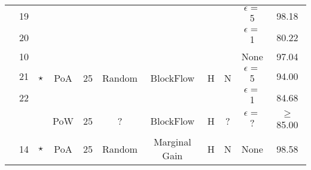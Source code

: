 \begin{landscape}
\begin{table}[]
\begin{tabular}{c|c|c|c|c|c|c|c|c|c|c}
                                                                                            & 19                  &                                            &                            &                          &                         &                                &                    &                    & $\epsilon =$ 5                  & 98.18                                  \\
                                                                                            & 20                  &                                            &                            &                          &                         &                                &                    &                    & $\epsilon =$ 1                  & 80.22                                  \\
                                                                                            & 10                  & \multirow{3}{*}{$\star$}                         & \multirow{3}{*}{PoA}       & \multirow{3}{*}{25}      & \multirow{3}{*}{Random} & \multirow{3}{*}{BlockFlow}     & \multirow{3}{*}{H} & \multirow{3}{*}{N} & None                   & 97.04                                  \\
                                                                                            & 21                  &                                            &                            &                          &                         &                                &                    &                    & $\epsilon =$ 5                  & 94.00                                  \\
                                                                                            & 22                  &                                            &                            &                          &                         &                                &                    &                    & $\epsilon =$ 1                  & 84.68                                  \\
                                                                                            &                     & \cite{10.48550/arxiv.2007.03856}                  & PoW                        & 25                       & ?                       & BlockFlow                      & H                  & ?                  & $\epsilon =$ ?                  & $\geq$ 85.00                  \\
                                                                                            & 14                  & \multirow{3}{*}{$\star$}                         & \multirow{3}{*}{PoA}       & \multirow{3}{*}{25}      & \multirow{3}{*}{Random} & \multirow{3}{*}{Marginal Gain} & \multirow{3}{*}{H} & \multirow{3}{*}{N} & None                   & 98.58                                  \\

\end{tabular}
\end{table}
\end{landscape}

